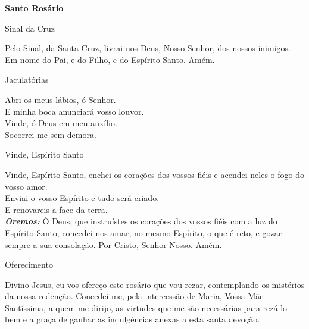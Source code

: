 \newpage
\newpage
\newpage
\newpage
\begin{center}
    \textbf{Santo Rosário}
\end{center}
\begin{center}
    Sinal da Cruz
\end{center}
\begin{flushleft}
    Pelo Sinal, \grecrossRed{} da Santa Cruz, livrai-nos Deus, \grecrossRed{} Nosso Senhor, dos nossos \grecrossRed{} inimigos. Em nome do Pai, \grecrossRed{} e do Filho, e do Espírito Santo. Amém.
\end{flushleft}
\begin{center}
    Jaculatórias
\end{center}
\begin{flushleft}
    \VbarRed{} Abri os meus lábios, ó Senhor. \\
    \RbarRed{} E minha boca anunciará vosso louvor.
    \vspace{.2cm} \\
    \VbarRed{} Vinde, ó Deus em meu auxílio. \\
    \RbarRed{} Socorrei-me sem demora.
\end{flushleft}
\begin{center}
    Vinde, Espírito Santo
\end{center}
\begin{flushleft}
    Vinde, Espírito Santo, enchei os corações dos vossos fiéis e acendei neles o fogo do vosso amor. \\
    \VbarRed{} Enviai o vosso Espírito e tudo será criado. \\
    \RbarRed{} E renovareis a face da terra.
    \vspace{.2cm} \\
    \textbf{\textit{Oremos:}} Ó Deus, que instruístes os corações dos vossos fiéis com a luz do Espírito Santo, concedei-nos amar, no mesmo Espírito, o que é reto, e gozar sempre a sua consolação. Por Cristo, Senhor Nosso. Amém. \\
\end{flushleft}
\begin{center}
    Oferecimento
\end{center}
\begin{flushleft}
    Divino Jesus, eu vos ofereço este rosário que vou rezar, contemplando os mistérios da nossa redenção. Concedei-me, pela intercessão de Maria, Vossa Mãe Santíssima, a quem me dirijo, as virtudes que me são necessárias para rezá-lo bem e a graça de ganhar as indulgências anexas a esta santa devoção.
\end{flushleft}
